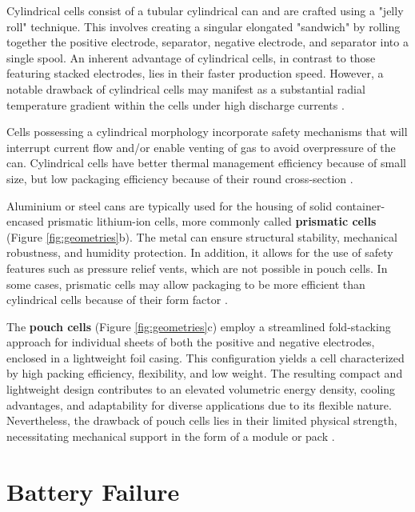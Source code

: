 Cylindrical cells consist of a tubular cylindrical can and are crafted using a "jelly roll" technique. This involves creating a singular elongated "sandwich" by rolling together the positive electrode, separator, negative electrode, and separator into a single spool. An inherent advantage of cylindrical cells, in contrast to those featuring stacked electrodes, lies in their faster production speed. However, a notable drawback of cylindrical cells may manifest as a substantial radial temperature gradient within the cells under high discharge currents \cite{baazouzi2023design}.

Cells possessing a cylindrical morphology incorporate safety mechanisms that will interrupt current flow and/or enable venting of gas to avoid overpressure of the can. Cylindrical cells have better thermal management efficiency because of small size, but low packaging efficiency because of their round cross-section \cite{das2018joining}.

Aluminium or steel cans are typically used for the housing of solid container-encased prismatic lithium-ion cells, more commonly called \textbf{prismatic cells} (Figure \ref{fig:geometries}b). The metal can ensure structural stability, mechanical robustness, and humidity protection. In addition, it allows for the use of safety features such as pressure relief vents, which are not possible in pouch cells. In some cases, prismatic cells may allow packaging to be more efficient than cylindrical cells because of their form factor \cite{das2018joining}.

The \textbf{pouch cells} (Figure \ref{fig:geometries}c) employ a streamlined fold-stacking approach for individual sheets of both the positive and negative electrodes, enclosed in a lightweight foil casing. This configuration yields a cell characterized by high packing efficiency, flexibility, and low weight. The resulting compact and lightweight design contributes to an elevated volumetric energy density, cooling advantages, and adaptability for diverse applications due to its flexible nature. Nevertheless, the drawback of pouch cells lies in their limited physical strength, necessitating mechanical support in the form of a module or pack \cite{santhanagopalan2013modeling}. %

\section{Battery Failure}
\label{sec:failure}

